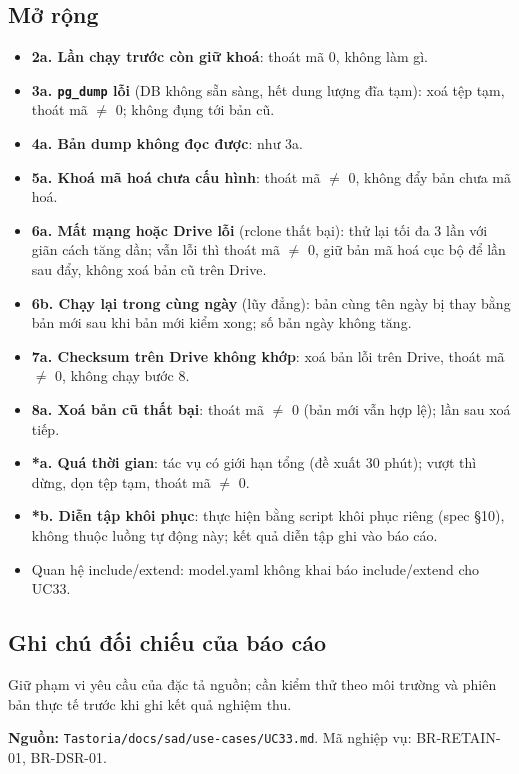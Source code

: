\subsection{Mở rộng}
\begin{itemize}
\item \textbf{2a. Lần chạy trước còn giữ khoá}: thoát mã 0, không làm gì.
\item \textbf{3a. {\small\texttt{pg\_\allowbreak{}\allowbreak{}dump}} lỗi} (DB không sẵn sàng, hết dung lượng đĩa tạm): xoá tệp tạm, thoát mã \ensuremath{\neq} 0; không đụng tới bản cũ.
\item \textbf{4a. Bản dump không đọc được}: như 3a.
\item \textbf{5a. Khoá mã hoá chưa cấu hình}: thoát mã \ensuremath{\neq} 0, không đẩy bản chưa mã hoá.
\item \textbf{6a. Mất mạng hoặc Drive lỗi} (rclone thất bại): thử lại tối đa 3 lần với giãn cách tăng dần; vẫn lỗi thì thoát mã \ensuremath{\neq} 0, giữ bản mã hoá cục bộ để lần sau đẩy, không xoá bản cũ trên Drive.
\item \textbf{6b. Chạy lại trong cùng ngày} (lũy đẳng): bản cùng tên ngày bị thay bằng bản mới sau khi bản mới kiểm xong; số bản ngày không tăng.
\item \textbf{7a. Checksum trên Drive không khớp}: xoá bản lỗi trên Drive, thoát mã \ensuremath{\neq} 0, không chạy bước 8.
\item \textbf{8a. Xoá bản cũ thất bại}: thoát mã \ensuremath{\neq} 0 (bản mới vẫn hợp lệ); lần sau xoá tiếp.
\item \textbf{*a. Quá thời gian}: tác vụ có giới hạn tổng (đề xuất 30 phút); vượt thì dừng, dọn tệp tạm, thoát mã \ensuremath{\neq} 0.
\item \textbf{*b. Diễn tập khôi phục}: thực hiện bằng script khôi phục riêng (spec \S{}10), không thuộc luồng tự động này; kết quả diễn tập ghi vào báo cáo.
\item Quan hệ include/\allowbreak{}extend: model.yaml không khai báo include/\allowbreak{}extend cho UC33.
\end{itemize}
\subsection{Ghi chú đối chiếu của báo cáo}
Giữ phạm vi yêu cầu của đặc tả nguồn; cần kiểm thử theo môi trường và phiên bản thực tế trước khi ghi kết quả nghiệm thu.

\textbf{Nguồn:} {\small\texttt{Tastoria/\allowbreak{}\allowbreak{}docs/\allowbreak{}\allowbreak{}sad/\allowbreak{}\allowbreak{}use-\allowbreak{}cases/\allowbreak{}\allowbreak{}UC33.\allowbreak{}md}}. Mã nghiệp vụ: BR-\allowbreak{}RETAIN-\allowbreak{}01, BR-\allowbreak{}DSR-\allowbreak{}01.

